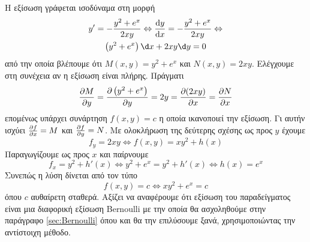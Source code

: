 \documentclass[11pt,a4paper,twoside]{book}
\newcommand{\eng}[1]{\selectlanguage{english}#1\selectlanguage{greek}}
\begin{document}
Η εξίσωση γράφεται ισοδύναμα στη μορφή
\begin{gather*}
y' = -\frac{y^2 + e^x}{2xy}\Leftrightarrow\diff{y}{x}=-\frac{y^2 + e^x}{2xy}\Leftrightarrow\\
\left(y^2+e^x\right)\d x+2xy\d y=0
\end{gather*}
από την οποία βλέπουμε ότι $M(x,y)=y^2+e^x$ και $N(x,y)=2xy$. Ελέγχουμε στη συνέχεια αν η εξίσωση είναι πλήρης. Πράγματι
\[ \diffp{M}{y}=\diffp{\left(y^2+e^x\right)}{y}=2y=\diffp{(2xy)}{x}=\diffp{N}{x} \]
επομένως υπάρχει συνάρτηση $f(x,y)=c$ η οποία ικανοποιεί την εξίσωση. Γι αυτήν ισχύει $\diffp{f}{x}=M$ και $\diffp{f}{y}=N$. Με ολοκλήρωση της δεύτερης σχέσης ως προς $y$ έχουμε
\[ f_y=2xy\Leftrightarrow f(x,y)=xy^2+h(x) \]
Παραγωγίζουμε ως προς $x$ και παίρνουμε
\[ f_x=y^2+h'(x)\Leftrightarrow y^2+e^x=y^2+h'(x)\Leftrightarrow h(x)=e^x \]
Συνεπώς η λύση δίνεται από τον τύπο
\[ f(x,y)=c\Leftrightarrow xy^2+e^x=c \]
όπου $c$ αυθαίρετη σταθερά. Αξίζει να αναφέρουμε ότι εξίσωση του παραδείγματος είναι μια διαφορική εξίσωση \eng{Bernoulli} με την οποία θα ασχοληθούμε στην παράγραφο \ref{sec:Bernoulli} όπου και θα την επιλύσουμε ξανά, χρησιμοποιώντας την αντίστοιχη μέθοδο.
\end{document}
